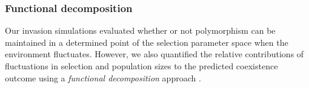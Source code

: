 \documentclass[12pt]{article}
\begin{document}
\subsubsection*{Functional decomposition}


Our invasion simulations evaluated whether or not polymorphism can be maintained in a determined point of the selection parameter space when the environment fluctuates. However, we also quantified the relative contributions of fluctuations in selection and population sizes to the predicted coexistence outcome using a \textit{functional decomposition} approach \citep{ellner2016quantify,ellner_expanded_2019, shoemaker2020}.




\end{document}
